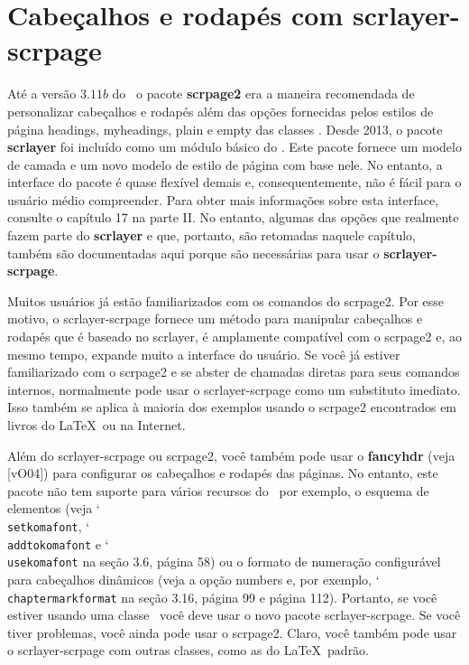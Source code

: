 \chapter{Cabeçalhos e rodapés com scrlayer-scrpage}

Até a versão $3.11b$ do \KOMAScript\ o pacote \textbf{scrpage2} era a maneira recomendada de personalizar cabeçalhos e rodapés além das opções fornecidas pelos estilos de página headings, myheadings, plain e empty das classes \KOMAScript. Desde 2013, o pacote \textbf{scrlayer} foi incluído como um módulo básico do \KOMAScript. Este pacote fornece um modelo de camada e um novo modelo de estilo de página com base nele. No entanto, a interface do pacote é quase flexível demais e, consequentemente, não é fácil para o usuário médio compreender. Para obter mais informações sobre esta interface, consulte o capítulo 17 na parte II. No entanto, algumas das opções que realmente fazem parte do \textbf{scrlayer} e que, portanto, são retomadas naquele capítulo, também são documentadas aqui porque são necessárias para usar o \textbf{scrlayer-scrpage}.

Muitos usuários já estão familiarizados com os comandos do scrpage2. Por esse motivo, o scrlayer-scrpage fornece um método para manipular cabeçalhos e rodapés que é baseado no scrlayer, é amplamente compatível com o scrpage2 e, ao mesmo tempo, expande muito a interface do usuário. Se você já estiver familiarizado com o scrpage2 e se abster de chamadas diretas para seus comandos internos, normalmente pode usar o scrlayer-scrpage como um substituto imediato. Isso também se aplica à maioria dos exemplos usando o scrpage2 encontrados em livros do \LaTeX\ ou na Internet.

Além do scrlayer-scrpage ou scrpage2, você também pode usar o \textbf{fancyhdr} (veja [vO04]) para configurar os cabeçalhos e rodapés das páginas. No entanto, este pacote não tem suporte para vários recursos do \KOMAScript\ por exemplo, o esquema de elementos (veja \char`\\\texttt{set\-ko\-ma\-font}, \char`\\\texttt{add\-to\-ko\-ma\-font} e \char`\\\texttt{use\-ko\-ma\-font} na seção 3.6, página 58) ou o formato de numeração configurável para cabeçalhos dinâmicos (veja a opção numbers e, por exemplo, \char`\\\texttt{chap\-ter\-mark\-for\-mat} na seção 3.16, página 99 e página 112). Portanto, se você estiver usando uma classe \KOMAScript\ você deve usar o novo pacote scrlayer-scrpage. Se você tiver problemas, você ainda pode usar o scrpage2. Claro, você também pode usar o scrlayer-scrpage com outras classes, como as do \LaTeX\ padrão.

